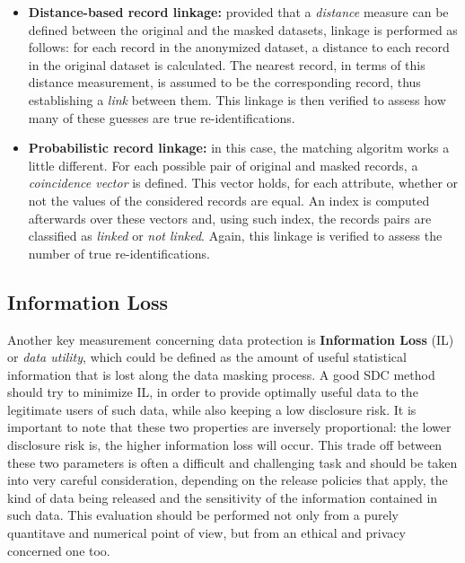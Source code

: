 \begin{itemize}
	\item \textbf{Distance-based record linkage:} provided that a \textit{distance} measure can be defined between the original and the masked datasets, linkage is performed as follows: for each record in the anonymized dataset, a distance to each record in the original dataset is calculated. The nearest record, in terms of this distance measurement, is assumed to be the corresponding record, thus establishing a \textit{link} between them. This linkage is then verified to assess how many of these guesses are true re-identifications.
	
	\item \textbf{Probabilistic record linkage:} in this case, the matching algoritm works a little different. For each possible pair of original and masked records, a \textit{coincidence vector} is defined. This vector holds, for each attribute, whether or not the values of the considered records are equal. An index is computed afterwards over these vectors and, using such index, the records pairs are classified as \textit{linked} or \textit{not linked}. Again, this linkage is verified to assess the number of true re-identifications.
\end{itemize}

\subsection{Information Loss}
\label{Theory:SDC:InfoLoss}

Another key measurement concerning data protection is \textbf{Information Loss} (IL) or \textit{data utility}, which could be defined as the amount of useful statistical information that is lost along the data masking process. A good SDC method should try to minimize IL, in order to provide optimally useful data to the legitimate users of such data, while also keeping a low disclosure risk. It is important to note that these two properties are inversely proportional: the lower disclosure risk is, the higher information loss will occur. This trade off between these two parameters is often a difficult and challenging task and should be taken into very careful consideration, depending on the release policies that apply, the kind of data being released and the sensitivity of the information contained in such data. This evaluation should be performed not only from a purely quantitave and numerical point of view, but from an ethical and privacy concerned one too.

